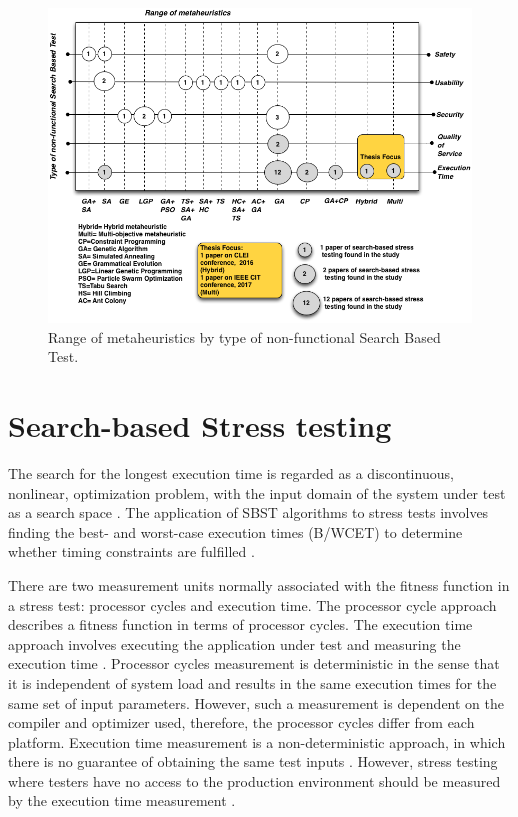 \documentclass[espaco=umemeio,chapter=TITLE,twoside,openright]{abnt}
\begin{document}
\begin{figure}[h]
\centering
\includegraphics[width=1\textwidth]{./images/metaheuristics.png}
\caption{Range of metaheuristics by type of non-functional Search Based Test\cite{Afzal2009a}. }
\label{fig:metabykind}
\end{figure}


\section{Search-based Stress testing}

The search for the longest execution time is regarded as a discontinuous, nonlinear, optimization problem, with the input domain of the system under test as a search space \cite{Sullivan}.  The application of SBST algorithms to stress tests involves finding the best- and worst-case execution times (B/WCET) to determine whether timing constraints are fulfilled \cite{Afzal2009a}.

There are two measurement units normally associated with the fitness function in a stress test: processor cycles and execution time. The processor cycle approach describes a fitness function in terms of processor cycles. The execution time approach involves executing the application under test and measuring the execution time \cite{Afzal2009a} \cite{tracey2000search}. Processor cycles measurement is deterministic in the sense that it is independent of system load and results in the same execution times for the same set of input parameters. However, such a measurement is dependent on the compiler and optimizer used, therefore, the processor cycles differ from each platform. Execution time measurement is a non-deterministic approach, in which there is no guarantee of obtaining the same test inputs \cite{Afzal2009a}.  However, stress testing where testers have no access to the production environment should be measured by the execution time measurement \cite{Molyneaux2009} \cite{Afzal2009a}.
\end{document}
